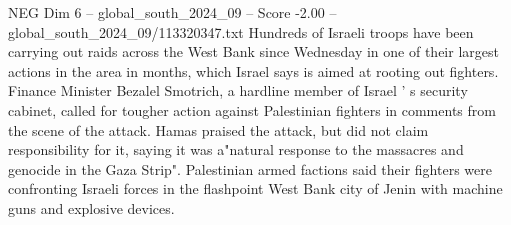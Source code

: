 \begin{textsample}{NEG Dim 6 – global\_south\_2024\_09 – Score -2.00 – global\_south\_2024\_09/113320347.txt}
Hundreds of Israeli troops have been carrying out raids across the West Bank since Wednesday in one of their largest actions in the area in months, which Israel says is aimed at rooting out fighters.
Finance Minister Bezalel Smotrich, a hardline member of Israel ' s security cabinet, called for tougher action against Palestinian fighters in comments from the scene of the attack.
Hamas praised the attack, but did not claim responsibility for it, saying it was a"natural response to the massacres and genocide in the Gaza Strip".
Palestinian armed factions said their fighters were confronting Israeli forces in the flashpoint West Bank city of Jenin with machine guns and explosive devices.

\end{textsample}

